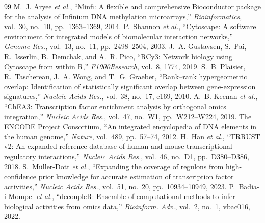 \documentclass[journal]{IEEEtran}
\begin{document}
\begin{thebibliography}{99}
 M.~J. Aryee \emph{et al.}, ``Minfi: A flexible and comprehensive Bioconductor package for the analysis of Infinium DNA methylation microarrays,'' \emph{Bioinformatics}, vol.~30, no.~10, pp.~1363--1369, 2014.
 P.~Shannon \emph{et al.}, ``Cytoscape: A software environment for integrated models of biomolecular interaction networks,'' \emph{Genome Res.}, vol.~13, no.~11, pp.~2498--2504, 2003.
 J.~A. Gustavsen, S.~Pai, R.~Isserlin, B.~Demchak, and A.~R. Pico, ``RCy3: Network biology using Cytoscape from within R,'' \emph{F1000Research}, vol.~8, 1774, 2019.
 S.~B. Plaisier, R.~Taschereau, J.~A. Wong, and T.~G. Graeber, ``Rank--rank hypergeometric overlap: Identification of statistically significant overlap between gene-expression signatures,'' \emph{Nucleic Acids Res.}, vol.~38, no.~17, e169, 2010.
 A.~B. Keenan \emph{et al.}, ``ChEA3: Transcription factor enrichment analysis by orthogonal omics integration,'' \emph{Nucleic Acids Res.}, vol.~47, no.~W1, pp.~W212--W224, 2019.
 The ENCODE Project Consortium, ``An integrated encyclopedia of DNA elements in the human genome,'' \emph{Nature}, vol.~489, pp.~57--74, 2012.
 H.~Han \emph{et al.}, ``TRRUST v2: An expanded reference database of human and mouse transcriptional regulatory interactions,'' \emph{Nucleic Acids Res.}, vol.~46, no.~D1, pp.~D380--D386, 2018.
 S.~M\"uller-Dott \emph{et al.}, ``Expanding the coverage of regulons from high-confidence prior knowledge for accurate estimation of transcription factor activities,'' \emph{Nucleic Acids Res.}, vol.~51, no.~20, pp.~10934--10949, 2023.
 P.~Badia-i-Mompel \emph{et al.}, ``decoupleR: Ensemble of computational methods to infer biological activities from omics data,'' \emph{Bioinform. Adv.}, vol.~2, no.~1, vbac016, 2022.
\end{thebibliography}
\end{document}
